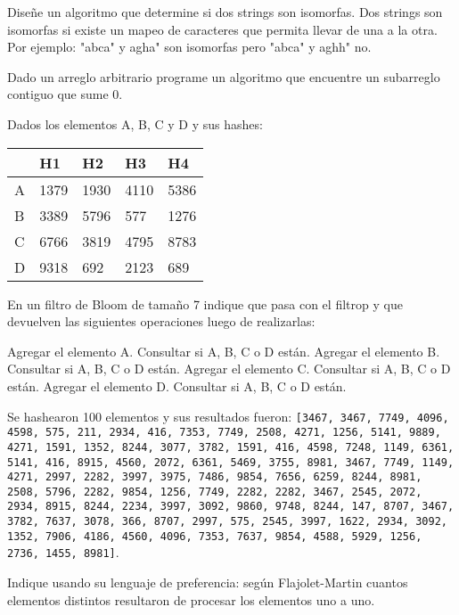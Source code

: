 \documentclass[titlepage,oneside]{book}
\begin{document}
\begin{Exercise}
	Diseñe un algoritmo que determine si dos strings son isomorfas. Dos strings son isomorfas si existe un mapeo de caracteres que permita llevar de una a la otra. Por ejemplo: "abca" y agha" son isomorfas pero "abca" y aghh" no.
\end{Exercise}

\begin{Exercise}
	Dado un arreglo arbitrario programe un algoritmo que encuentre un subarreglo contiguo que sume 0.
\end{Exercise}

\begin{Exercise}
	Dados los elementos A, B, C y D y sus hashes:
 
\begin{table}[H]
\centering
\begin{tabular}{|l|l|l|l|l|}
\hline
 & H1 & H2 & H3 & H4 \\ \hline
A & 1379 & 1930 & 4110 & 5386 \\ \hline
B & 3389 & 5796 & 577 & 1276 \\ \hline
C & 6766 & 3819 & 4795 & 8783 \\ \hline
D & 9318 & 692 & 2123 & 689 \\ \hline
\end{tabular}
\end{table}

En un filtro de Bloom de tamaño 7 indique que pasa con el filtrop y que devuelven las siguientes operaciones luego de realizarlas:

\Question Agregar el elemento A.
\Question Consultar si A, B, C o D están.
\Question Agregar el elemento B.
\Question Consultar si A, B, C o D están.
\Question Agregar el elemento C.
\Question Consultar si A, B, C o D están.
\Question Agregar el elemento D.
\Question Consultar si A, B, C o D están.

\end{Exercise}

\begin{Exercise}Se hashearon 100 elementos y sus resultados fueron: \texttt{[3467, 3467, 7749, 4096, 4598, 575, 211, 2934, 416, 7353, 7749, 2508, 4271, 1256, 5141, 9889, 4271, 1591, 1352, 8244, 3077, 3782, 1591, 416, 4598, 7248, 1149, 6361, 5141, 416, 8915, 4560, 2072, 6361, 5469, 3755, 8981, 3467, 7749, 1149, 4271, 2997, 2282, 3997, 3975, 7486, 9854, 7656, 6259, 8244, 8981, 2508, 5796, 2282, 9854, 1256, 7749, 2282, 2282, 3467, 2545, 2072, 2934, 8915, 8244, 2234, 3997, 3092, 9860, 9748, 8244, 147, 8707, 3467, 3782, 7637, 3078, 366, 8707, 2997, 575, 2545, 3997, 1622, 2934, 3092, 1352, 7906, 4186, 4560, 4096, 7353, 7637, 9854, 4588, 5929, 1256, 2736, 1455, 8981]}. 
 
 Indique usando su lenguaje de preferencia: según Flajolet-Martin cuantos elementos distintos resultaron de procesar los elementos uno a uno.
\end{Exercise}
\end{document}

